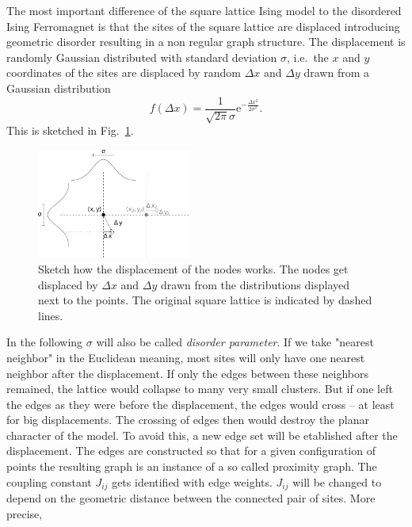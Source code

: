 The most important difference of the square lattice Ising model to the
disordered Ising Ferromagnet is that the sites of the square lattice are
displaced introducing geometric disorder resulting in a non regular graph
structure.
The displacement is randomly Gaussian distributed with standard
deviation \(\sigma\), i.e.\ the \(x\) and \(y\) coordinates of the
sites are displaced by random \(\Delta x\) and \(\Delta y\) drawn
from a Gaussian distribution
\begin{equation}
    f(\Delta x)=\frac{1}{\sqrt{2\pi}\sigma}\mathrm{e}^{-\frac{\Delta x^2}{2\sigma^2}}.
    \label{eq:gauss}
\end{equation}
This is sketched in Fig.\ \ref{fig:displacement}.
\begin{figure}[htbp]
    \centering
    \includegraphics[width=0.45\textwidth]{images/displacement}
    \caption[Sketch how the Displacement works]
    {
        Sketch how the displacement of the nodes works. The nodes
        get displaced by \(\Delta x\) and \(\Delta y\) drawn from the
        distributions displayed next to the points. The original
        square lattice is indicated by dashed lines.
    }
    \label{fig:displacement}
\end{figure}
In the following \(\sigma\) will also be called \emph{disorder parameter}.
If we take "nearest neighbor" in the Euclidean meaning, most sites
will only have one nearest neighbor after the
displacement. If only the edges between these neighbors remained,
the lattice would collapse to many very small clusters. But if one
left the edges as they were before the displacement, the edges would
cross -- at least for big displacements. The crossing of edges then
would destroy the planar character of the model.
To avoid this, a new edge set will be etablished after the displacement.
The edges are constructed
so that for a given configuration of points the resulting graph is an
instance of a so called proximity graph. The coupling constant \(J_{ij}\) gets
identified with edge weights. \(J_{ij}\) will be changed to depend on the
geometric distance between the connected pair of sites. More precise,

